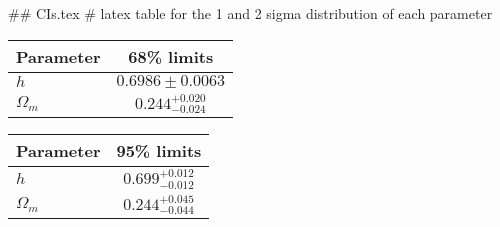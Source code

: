 ## CIs.tex
# latex table for the 1 and 2 sigma distribution of each parameter

\begin{tabular} { l  c}
 Parameter &  68\% limits\\
\hline
{\boldmath$h              $} & $0.6986\pm 0.0063          $\\
{\boldmath$\Omega_m       $} & $0.244^{+0.020}_{-0.024}   $\\
\hline
\end{tabular}

\begin{tabular} { l  c}
 Parameter &  95\% limits\\
\hline
{\boldmath$h              $} & $0.699^{+0.012}_{-0.012}   $\\
{\boldmath$\Omega_m       $} & $0.244^{+0.045}_{-0.044}   $\\
\hline
\end{tabular}

